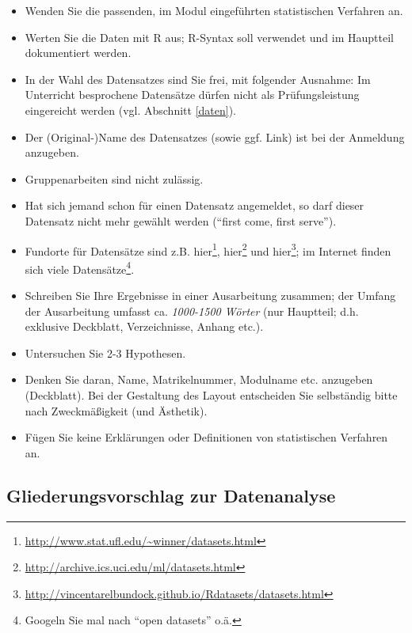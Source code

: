 \documentclass[12pt,ngerman,]{book}
\let\rmarkdownfootnote\footnote%
\def\footnote{\protect\rmarkdownfootnote}
\renewcommand{\href}[2]{#2\footnote{\url{#1}}}
\begin{document}
\begin{itemize}
\item
  Wenden Sie die passenden, im Modul eingeführten statistischen
  Verfahren an.
\item
  Werten Sie die Daten mit R aus; R-Syntax soll verwendet und im
  Hauptteil dokumentiert werden.
\item
  In der Wahl des Datensatzes sind Sie frei, mit folgender Ausnahme: Im
  Unterricht besprochene Datensätze dürfen nicht als Prüfungsleistung
  eingereicht werden (vgl. Abschnitt \ref{daten}).
\item
  Der (Original-)Name des Datensatzes (sowie ggf. Link) ist bei der
  Anmeldung anzugeben.
\item
  Gruppenarbeiten sind nicht zulässig.
\item
  Hat sich jemand schon für einen Datensatz angemeldet, so darf dieser
  Datensatz nicht mehr gewählt werden (``first come, first serve'').
\item
  Fundorte für Datensätze sind z.B.
  \href{http://www.stat.ufl.edu/~winner/datasets.html}{hier},
  \href{http://archive.ics.uci.edu/ml/datasets.html}{hier} und
  \href{http://vincentarelbundock.github.io/Rdatasets/datasets.html}{hier};
  im Internet finden sich viele Datensätze\footnote{Googeln Sie mal nach
    ``open datasets'' o.ä.}.
\item
  Schreiben Sie Ihre Ergebnisse in einer Ausarbeitung zusammen; der
  Umfang der Ausarbeitung umfasst ca. \emph{1000-1500 Wörter} (nur
  Hauptteil; d.h. exklusive Deckblatt, Verzeichnisse, Anhang etc.).
\item
  Untersuchen Sie 2-3 Hypothesen.
\item
  Denken Sie daran, Name, Matrikelnummer, Modulname etc. anzugeben
  (Deckblatt). Bei der Gestaltung des Layout entscheiden Sie selbständig
  bitte nach Zweckmäßigkeit (und Ästhetik).
\item
  Fügen Sie keine Erklärungen oder Definitionen von statistischen
  Verfahren an.
\end{itemize}

\subsection{Gliederungsvorschlag zur
Datenanalyse}\label{gliederungsvorschlag-zur-datenanalyse}
\end{document}
